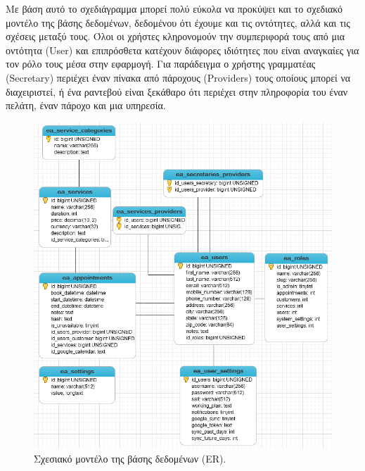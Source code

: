 Με βάση αυτό το σχεδιάγραμμα μπορεί πολύ εύκολα να προκύψει και το σχεδιακό μοντέλο της βάσης δεδομένων, δεδομένου ότι έχουμε και τις οντότητες, αλλά και τις σχέσεις μεταξύ τους. Όλοι οι χρήστες κληρονομούν την συμπεριφορά τους από μια οντότητα (User) και επιπρόσθετα κατέχουν διάφορες ιδιότητες που είναι αναγκαίες για τον ρόλο τους μέσα στην εφαρμογή. Για παράδειγμα ο χρήστης γραμματέας (Secretary) περιέχει έναν πίνακα από πάροχους (Providers) τους οποίους μπορεί να διαχειριστεί, ή ένα ραντεβού είναι ξεκάθαρο ότι περιέχει στην πληροφορία του έναν πελάτη, έναν πάροχο και μια υπηρεσία.

\begin{figure}[ht!]
\centering
\includegraphics[width=160mm]{images/er.png}
\caption{Σχεσιακό μοντέλο της βάσης δεδομένων (ER).}
\label{er}
\end{figure}

